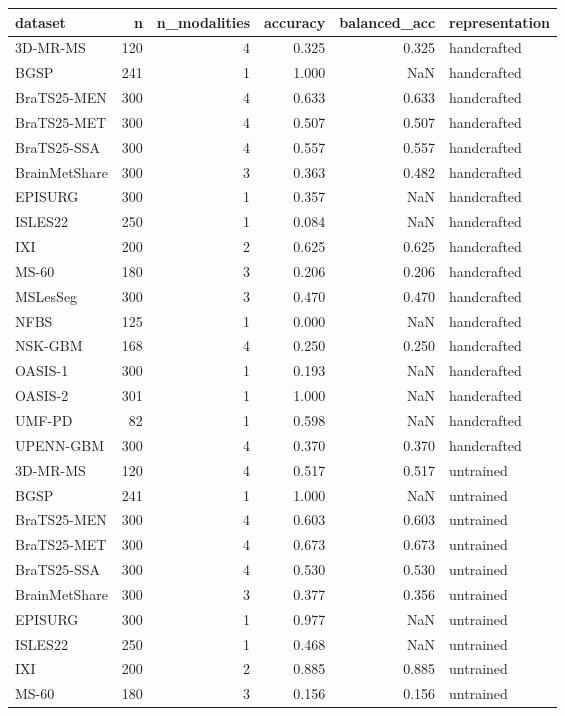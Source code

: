 \begin{tabular}{lrrrrl}
\toprule
dataset & n & n\_modalities & accuracy & balanced\_acc & representation \\
\midrule
3D-MR-MS & 120 & 4 & 0.325 & 0.325 & handcrafted \\
BGSP & 241 & 1 & 1.000 & NaN & handcrafted \\
BraTS25-MEN & 300 & 4 & 0.633 & 0.633 & handcrafted \\
BraTS25-MET & 300 & 4 & 0.507 & 0.507 & handcrafted \\
BraTS25-SSA & 300 & 4 & 0.557 & 0.557 & handcrafted \\
BrainMetShare & 300 & 3 & 0.363 & 0.482 & handcrafted \\
EPISURG & 300 & 1 & 0.357 & NaN & handcrafted \\
ISLES22 & 250 & 1 & 0.084 & NaN & handcrafted \\
IXI & 200 & 2 & 0.625 & 0.625 & handcrafted \\
MS-60 & 180 & 3 & 0.206 & 0.206 & handcrafted \\
MSLesSeg & 300 & 3 & 0.470 & 0.470 & handcrafted \\
NFBS & 125 & 1 & 0.000 & NaN & handcrafted \\
NSK-GBM & 168 & 4 & 0.250 & 0.250 & handcrafted \\
OASIS-1 & 300 & 1 & 0.193 & NaN & handcrafted \\
OASIS-2 & 301 & 1 & 1.000 & NaN & handcrafted \\
UMF-PD & 82 & 1 & 0.598 & NaN & handcrafted \\
UPENN-GBM & 300 & 4 & 0.370 & 0.370 & handcrafted \\
3D-MR-MS & 120 & 4 & 0.517 & 0.517 & untrained \\
BGSP & 241 & 1 & 1.000 & NaN & untrained \\
BraTS25-MEN & 300 & 4 & 0.603 & 0.603 & untrained \\
BraTS25-MET & 300 & 4 & 0.673 & 0.673 & untrained \\
BraTS25-SSA & 300 & 4 & 0.530 & 0.530 & untrained \\
BrainMetShare & 300 & 3 & 0.377 & 0.356 & untrained \\
EPISURG & 300 & 1 & 0.977 & NaN & untrained \\
ISLES22 & 250 & 1 & 0.468 & NaN & untrained \\
IXI & 200 & 2 & 0.885 & 0.885 & untrained \\
MS-60 & 180 & 3 & 0.156 & 0.156 & untrained \\

\end{tabular}
